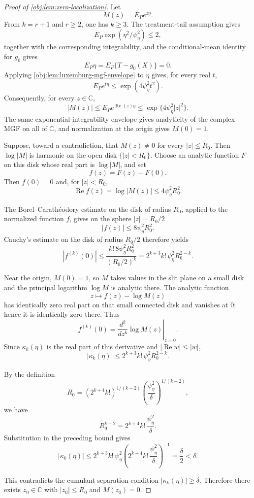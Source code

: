\begin{proof}[Proof of \cref{obj:lem:zero-localization}]
Let
\[
M(z)=E_Pe^{z\eta}.
\]
From \(k=r+1\) and \(r\ge2\), one has \(k\ge3\).  The treatment-tail assumption gives
\[
E_P\exp(\eta^2/\psi_\eta^2)\le2,
\]
together with the corresponding integrability, and the conditional-mean identity for \(g_0\) gives
\[
E_P\eta=E_P\{T-g_0(X)\}=0.
\]
Applying \cref{obj:lem:luxemburg-mgf-envelope} to \(\eta\) gives, for every real \(t\),
\[
E_Pe^{t\eta}\le \exp(4\psi_\eta^2t^2).
\]
Consequently, for every \(z\in\mathbb C\),
\[
|M(z)|
\le E_Pe^{\operatorname{Re}(z)\eta}
\le \exp\{4\psi_\eta^2|z|^2\}.
\]
The same exponential-integrability envelope gives analyticity of the complex MGF on all of \(\mathbb C\), and normalization at the origin gives \(M(0)=1\).

Suppose, toward a contradiction, that \(M(z)\ne0\) for every \(|z|\le R_0\).  Then \(\log |M|\) is harmonic on the open disk \(\{|z|<R_0\}\).  Choose an analytic function \(F\) on this disk whose real part is \(\log|M|\), and set
\[
f(z)=F(z)-F(0).
\]
Then \(f(0)=0\) and, for \(|z|<R_0\),
\[
\operatorname{Re} f(z)=\log |M(z)|\le 4\psi_\eta^2R_0^2.
\]

The Borel--Carath\'eodory estimate on the disk of radius \(R_0\), applied to the normalized function \(f\), gives on the sphere \(|z|=R_0/2\)
\[
|f(z)|\le 8\psi_\eta^2R_0^2.
\]
Cauchy's estimate on the disk of radius \(R_0/2\) therefore yields
\[
|f^{(k)}(0)|
\le
\frac{k!\,8\psi_\eta^2R_0^2}{(R_0/2)^k}
=
2^{k+3}k!\,\psi_\eta^2R_0^{2-k}.
\]

Near the origin, \(M(0)=1\), so \(M\) takes values in the slit plane on a small disk and the principal logarithm \(\log M\) is analytic there.  The analytic function
\[
z\mapsto f(z)-\log M(z)
\]
has identically zero real part on that small connected disk and vanishes at \(0\); hence it is identically zero there.  Thus
\[
f^{(k)}(0)=\left.\frac{d^k}{dz^k}\log M(z)\right|_{z=0}.
\]
Since \(\kappa_k(\eta)\) is the real part of this derivative and \(|\operatorname{Re} w|\le |w|\),
\[
|\kappa_k(\eta)|
\le 2^{k+3}k!\,\psi_\eta^2R_0^{2-k}.
\]

By the definition
\[
R_0=(2^{k+4}k!)^{1/(k-2)}
       \left(\frac{\psi_\eta^2}{\delta}\right)^{1/(k-2)},
\]
we have
\[
R_0^{k-2}
=
2^{k+4}k!\,\frac{\psi_\eta^2}{\delta}.
\]
Substitution in the preceding bound gives
\[
|\kappa_k(\eta)|
\le
2^{k+3}k!\,\psi_\eta^2
\left(2^{k+4}k!\,\frac{\psi_\eta^2}{\delta}\right)^{-1}
=\frac{\delta}{2}
<\delta.
\]

This contradicts the cumulant separation condition \(|\kappa_k(\eta)|\ge\delta\).  Therefore there exists \(z_0\in\mathbb C\) with \(|z_0|\le R_0\) and \(M(z_0)=0\).
\end{proof}
